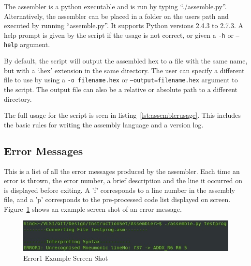 The assembler is a python executable and is run by typing ``./assemble.py''. 
Alternatively, the assembler can be placed in a folder on the users path and executed by running ``assemble.py''.
It supports Python versions 2.4.3 to 2.7.3.
A help prompt is given by the script if the usage is not correct, or given a \texttt{-h} or \texttt{--help} argument. 

By default, the script will output the assembled hex to a file with the same name, but with a `.hex' extension in the same directory.
The user can specify a different file to use by using a \texttt{-o filename.hex} or \texttt{--output=filename.hex} argument to the script.
The output file can also be a relative or absolute path to a different directory. 

The full usage for the script is seen in listing~\ref{lst:assemblerusage}. 
This includes the basic rules for writing the assembly language and a version log. 

%

\subsection{Error Messages}
This is a list of all the error messages produced by the assembler. 
Each time an error is thrown, the error number, a brief description and the line it occurred on is displayed before exiting. 
A 'f' corresponds to a line number in the assembly file, and a 'p' corresponds to the pre-processed code list displayed on screen. 
Figure~\ref{fig:AssErrorEx} shows an example screen shot of an error message.



\begin{figure}[h]
	\includegraphics{Figures/error1screenshot.jpg}
	\caption{Error1 Example Screen Shot}
	\label{fig:AssErrorEx}
\end{figure}

